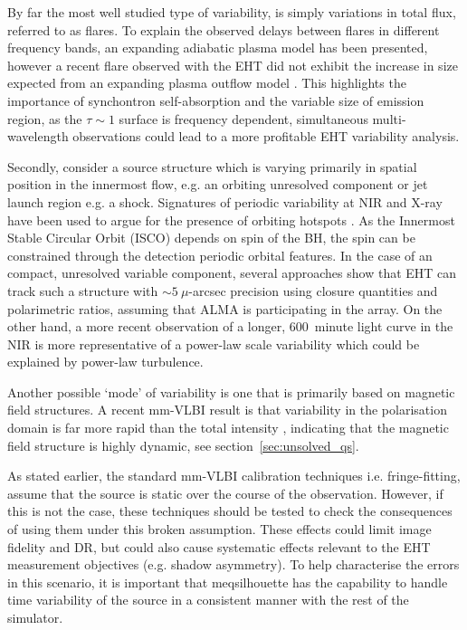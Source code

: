 By far the most well studied type of variability, is simply variations in total flux, referred to as flares. To explain the observed delays between flares in different frequency bands, an expanding adiabatic plasma model \citep[e.g.][]{Marrone_2008} has been presented, however a recent flare observed with the EHT did not exhibit the increase in size expected from an expanding plasma outflow model \cite{Fish_2011}. This highlights the importance of synchontron self-absorption and the variable size of emission region, as the $\tau \sim 1$ surface is frequency dependent, simultaneous multi-wavelength observations could lead to a more profitable EHT variability analysis.

Secondly, consider a source structure which is varying primarily in spatial position in the innermost flow, e.g. an orbiting unresolved component or jet launch region e.g. a shock. Signatures of periodic variability at NIR and X-ray \citep{Genzel_2003,Belanger_2006} have been used to argue for the presence of orbiting hotspots \cite{Doeleman_2009}. As the Innermost Stable Circular Orbit (ISCO) depends on spin of the BH, the spin can be constrained through the detection periodic orbital features. %
In the case of an compact, unresolved variable component, several approaches \citep{Doeleman_2009, Fish_2009b, Johnson_2014} show that EHT can track such a structure with $\sim 5\ \mu$-arcsec precision using closure quantities and polarimetric ratios, assuming that ALMA is participating in the array. On the other hand, a more recent observation of a longer, 600~minute light curve in the NIR is more representative of a power-law scale variability \cite{Meyer_2008} which could be explained by power-law turbulence. 

Another possible `mode' of variability is one that is primarily based on magnetic field structures. A recent mm-VLBI result is that variability in the polarisation domain is far more rapid than the total intensity \citep{Johnson_2015b}, indicating that the magnetic field structure is highly dynamic, see section~\ref{sec:unsolved_qs}. 




As stated earlier, the standard mm-VLBI calibration techniques i.e. fringe-fitting, assume that the source is static over the course of the observation. However, if this is not the case, these techniques should be tested to check the consequences of using them under this broken assumption. These effects could limit image fidelity and DR, but could also cause systematic effects relevant to the EHT measurement objectives (e.g. shadow asymmetry). To help characterise the errors in this scenario, it is important that {\sc meqsilhouette} has the capability to handle time variability of the source in a consistent manner with the rest of the simulator.

